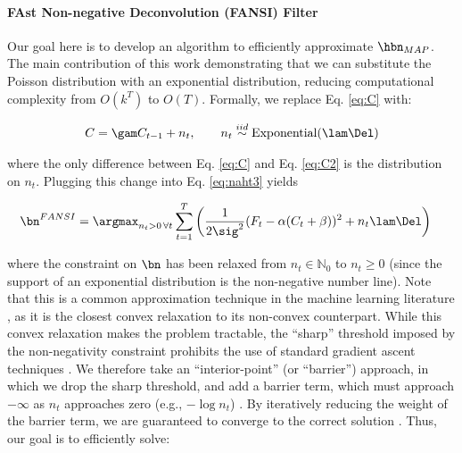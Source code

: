\paragraph{FAst Non-negative Deconvolution (FANSI) Filter}

Our goal here is to develop an algorithm to efficiently approximate $\hbn_{MAP}$.  The main contribution of this work demonstrating that we can substitute the Poisson distribution with an exponential distribution, reducing computational complexity from $O(k^T)$ to $O(T)$.  Formally, we replace Eq. \eqref{eq:C} with:

\begin{align} \label{eq:C2}
	C = \gam C_{t-1} + n_t, \qquad n_t \overset{iid}{\sim} \text{Exponential}(\lam \Del)
\end{align}

\noindent where the only difference between Eq. \eqref{eq:C} and Eq. \eqref{eq:C2} is the distribution on $n_t$.  Plugging this change into Eq. \eqref{eq:naht3} yields

\begin{align} \label{eq:obj2}
\bn^{FANSI} &= \argmax_{n_t>0 \, \forall t}  \sum_{t=1}^T \bigg( \frac{1}{2 \sig^2}(F_t - \alpha(C_t + \beta))^2  + n_t \lam \Del \bigg) %
\end{align}

\noindent where the constraint on $\bn$ has been relaxed from  $n_t \in \mathbb{N}_0$ to $n_t \geq 0$ (since the support of an exponential distribution is the non-negative number line).  Note that this is a common approximation technique in the machine learning literature \cite{HastieFriedman01}, as it is the closest convex relaxation to its non-convex counterpart. While this convex relaxation makes the problem tractable, the ``sharp'' threshold imposed by the non-negativity constraint prohibits the use of standard gradient ascent techniques \cite{BoydVandenberghe04}. We therefore take an ``interior-point'' (or ``barrier'') approach, in which we drop the sharp threshold, and add a barrier term, which must approach $-\infty$ as $n_t$ approaches zero (e.g., $-\log n_t$) \cite{BoydVandenberghe04}.  By iteratively reducing the weight of the barrier term, we are guaranteed to converge to the correct solution \cite{BoydVandenberghe04}.  Thus, our goal is to efficiently solve:

